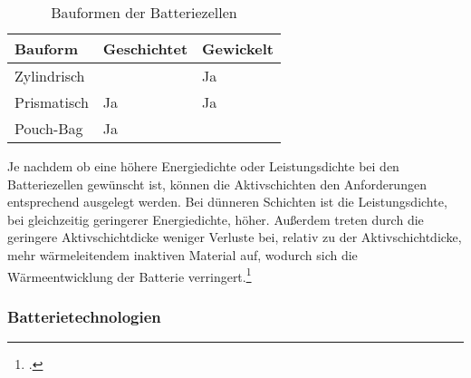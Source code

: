 \begin{table}[H]
	\caption{Bauformen der Batteriezellen}
	\label{tab:BauformenZelle}
	\vspace{0.2cm}	
	\begin{tabularx}{\textwidth}{ |X|X|X|  }
		\toprule[1.5pt]
		\textbf{Bauform} & \textbf{Geschichtet} & \textbf{Gewickelt} \\
		\hline\hline
		Zylindrisch &  & Ja\\
		\hline
		Prismatisch & Ja & Ja \\
		\hline
		Pouch-Bag & Ja &  \\
		\bottomrule[1.5pt]
	\end{tabularx}		
\end{table}

Je nachdem ob eine höhere Energiedichte oder Leistungsdichte bei den Batteriezellen gewünscht ist, können die Aktivschichten den Anforderungen entsprechend ausgelegt werden. Bei dünneren Schichten ist die Leistungsdichte, bei gleichzeitig geringerer Energiedichte, höher. Außerdem treten durch die geringere Aktivschichtdicke weniger Verluste bei, relativ zu der Aktivschichtdicke, mehr wärmeleitendem inaktiven Material auf, wodurch sich die Wärmeentwicklung der Batterie verringert.\footcite[Vlg.\label{Ecker2013}][S.66-67]{Ecker2013}\\

\subsubsection*{Batterietechnologien}\label{subsub:BatTechnology}

